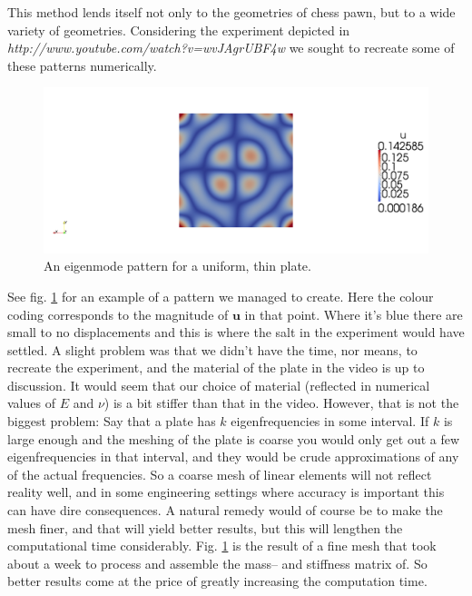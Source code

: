 \documentclass[paper=a4, fontsize=11pt]{scrartcl} %
\begin{document}
This method lends itself not only to the geometries of chess pawn, but to a wide variety of geometries. Considering the experiment depicted in \textit{http://www.youtube.com/watch?v=wvJAgrUBF4w} we sought to recreate some of these patterns numerically. 
\begin{figure}
\centering
\includegraphics[scale=0.4, trim=100mm 0mm 100mm 0mm, clip]{18.png}
\caption{An eigenmode pattern for a uniform, thin plate.}
\label{fig:LargePlate18}
\end{figure}
See fig. \ref{fig:LargePlate18} for an example of a pattern we managed to create. Here the colour coding corresponds to the magnitude of $\boldsymbol{u}$ in that point. Where it's blue there are small to no displacements and this is where the salt in the experiment would have settled. A slight problem was that we didn't have the time, nor means, to recreate the experiment, and the material of the plate in the video is up to discussion. It would seem that our choice of material (reflected in numerical values of $E$ and $\nu$) is a bit stiffer than that in the video. However, that is not the biggest problem: Say that a plate has $k$ eigenfrequencies in some interval. If $k$ is large enough and the meshing of the plate is coarse you would only get out a few eigenfrequencies in that interval, and they would be crude approximations of any of the actual frequencies. So a coarse mesh of linear elements will not reflect reality well, and in some engineering settings where accuracy is important this can have dire consequences. A natural remedy would of course be to make the mesh finer, and that will yield better results, but this will lengthen the computational time considerably. Fig. \ref{fig:LargePlate18} is the result of a fine mesh that took about a week to process and assemble the mass-- and stiffness matrix of. So better results come at the price of greatly increasing the computation time.
\end{document}
